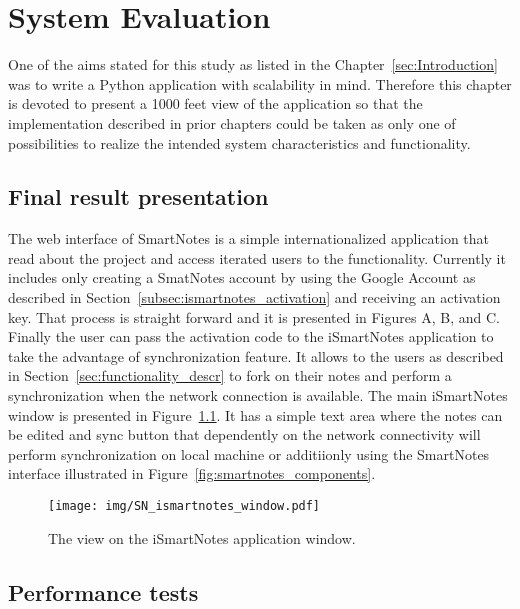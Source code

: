 \chapter{System Evaluation}\label{chap:eval}
One of the aims stated for this study as listed in the Chapter~\ref{sec:Introduction} was to write a Python application with scalability in mind. Therefore this chapter is devoted to present a 1000 feet view of the application so that the implementation described in prior chapters could be taken as only one of possibilities to realize the intended system characteristics and functionality.   

\section{Final result presentation}\label{sec:result} 
The web interface of SmartNotes is a simple internationalized application that read about the project and access iterated users to the functionality. Currently it includes only creating a SmatNotes account by using the Google Account as described in Section~\ref{subsec:ismartnotes_activation} and receiving an activation key. That process is straight forward and it is presented in Figures A, B, and C. Finally the user can pass the activation code to  the iSmartNotes
application to take the advantage of synchronization feature. It allows to the users as described in Section~\ref{sec:functionality_descr} to fork on their notes and perform a synchronization when the network connection is available.
The main iSmartNotes window is presented in Figure~\ref{fig:ismartnotes_window}. It has a simple text area where the notes can be edited and sync button that dependently on the network connectivity will perform synchronization on local machine or additiionly using the SmartNotes interface illustrated in Figure~\ref{fig:smartnotes_components}.         
\begin{figure}[ht]
\begin{center}
\texttt{[image: img/SN\_ismartnotes\_window.pdf]}
\caption{The view on the iSmartNotes application window.}
\label{fig:ismartnotes_window}
\end{center}
\end{figure}

\section{Performance tests}\label{sec:performance} 